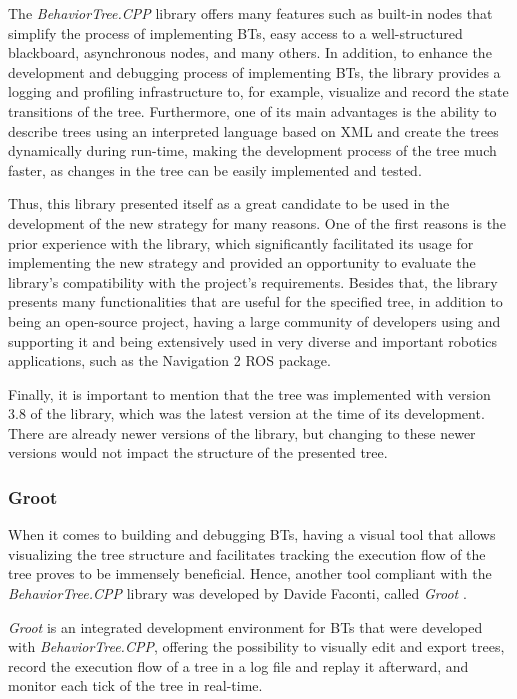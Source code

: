The \textit{BehaviorTree.CPP} library offers many features such as built-in nodes that simplify the process of implementing BTs, easy access to a well-structured blackboard, asynchronous nodes, and many others. In addition, to enhance the development and debugging process of implementing BTs, the library provides a logging and profiling infrastructure to, for example, visualize and record the state transitions of the tree. Furthermore, one of its main advantages is the ability to describe trees using an interpreted language based on XML and create the trees dynamically during run-time, making the development process of the tree much faster, as changes in the tree can be easily implemented and tested.

Thus, this library presented itself as a great candidate to be used in the development of the new strategy for many reasons. One of the first reasons is the prior experience with the library, which significantly facilitated its usage for implementing the new strategy and provided an opportunity to evaluate the library's compatibility with the project's requirements. Besides that, the library presents many functionalities that are useful for the specified tree, in addition to being an open-source project, having a large community of developers using and supporting it and being extensively used in very diverse and important robotics applications, such as the Navigation 2 \cite{nav2} ROS package.

Finally, it is important to mention that the tree was implemented with version 3.8 of the library, which was the latest version at the time of its development. There are already newer versions of the library, but changing to these newer versions would not impact the structure of the presented tree.

\subsubsection{Groot}
\label{subsubsec:groot}

When it comes to building and debugging BTs, having a visual tool that allows visualizing the tree structure and facilitates tracking the execution flow of the tree proves to be immensely beneficial. Hence, another tool compliant with the \textit{BehaviorTree.CPP} library was developed by Davide Faconti, called \textit{Groot} \cite{Groot}.

\textit{Groot} is an integrated development environment for BTs that were developed with \textit{BehaviorTree.CPP}, offering the possibility to visually edit and export trees, record the execution flow of a tree in a log file and replay it afterward, and monitor each tick of the tree in real-time.

